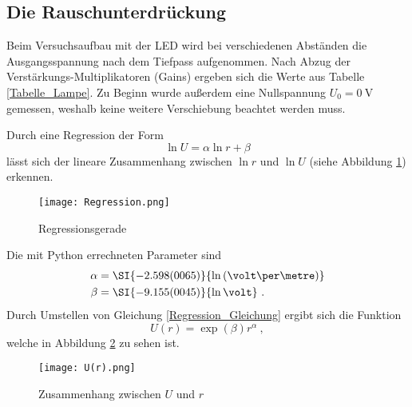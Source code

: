 \subsection{Die Rauschunterdrückung}\label{Rauschunterdruckung}
Beim Versuchsaufbau mit der LED wird bei verschiedenen Abständen die Ausgangsspannung nach dem Tiefpass aufgenommen. Nach Abzug der Verstärkungs-Multiplikatoren (Gains) ergeben sich die Werte aus Tabelle \ref{Tabelle_Lampe}. Zu Beginn wurde außerdem eine Nullspannung $U_0=\SI{0}{\volt}$ gemessen, weshalb keine weitere Verschiebung beachtet werden muss. 

Durch eine Regression der Form
\begin{equation}\label{Regression_Gleichung}
	\ln U = \alpha\ln r +\beta
\end{equation}
lässt sich der lineare Zusammenhang zwischen $\ln r$ und $\ln U$ (siehe Abbildung \ref{Regression}) erkennen.
\begin{figure}[h!]
	\texttt{[image: Regression.png]}
	\caption{Regressionsgerade}
	\label{Regression}
\end{figure}
Die mit Python errechneten Parameter sind
\begin{align}
	\alpha &= \SI{-2.598(0065)}{\ln\left(\volt\per\metre\right)} \\
	\beta &= \SI{-9.155(0045)}{\ln\volt}\ .
\end{align}
Durch Umstellen von Gleichung \eqref{Regression_Gleichung} ergibt sich die Funktion
\begin{equation}
	U(r) = \exp(\beta) r^\alpha\ ,
\end{equation}
welche in Abbildung \ref{U(r)} zu sehen ist.
\begin{figure}[h!]
	\texttt{[image: U(r).png]}
	\caption{Zusammenhang zwischen $U$ und $r$}
	\label{U(r)}
\end{figure}